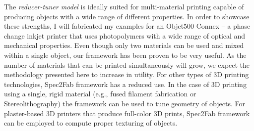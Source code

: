 The \emph{reducer-tuner model} is ideally suited for multi-material printing capable of producing objects with a wide range of different properties.
In order to showcase these strengths, I will fabricated my examples for an Objet500 Connex -- a phase change inkjet printer that uses photopolymers with a wide range of optical and mechanical properties. Even though only two materials can be used and mixed within a single object, our framework has been proven to be very useful. 
As the number of materials that can be printed simultaneously will grow, we expect the methodology presented here to increase in utility.
For other types of 3D printing technologies, Spec2Fab framework has a reduced use. In the case of 3D printing using a single, rigid material (e.g., fused filament fabrication or Stereolithography) the framework can be used to tune geometry of objects. For plaster-based 3D printers that produce full-color 3D prints, Spec2Fab framework can be employed to compute proper texturing of objects.
